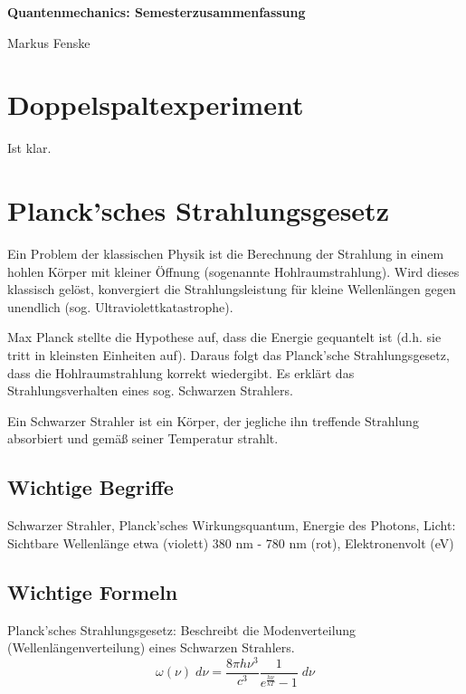 \documentclass[a4paper,german,10pt,smallheadings]{scrartcl}
\begin{document}
\begin{center}
\bfseries %
\sffamily %
\vspace{-40pt}
Quantenmechanics: Semesterzusammenfassung

Markus Fenske
\vspace{-10pt}
\end{center}

\section{Doppelspaltexperiment}

Ist klar.

\section{Planck'sches Strahlungsgesetz}

Ein Problem der klassischen Physik ist die Berechnung der Strahlung in einem
hohlen Körper mit kleiner Öffnung (sogenannte Hohlraumstrahlung). Wird dieses
klassisch gelöst, konvergiert die Strahlungsleistung für kleine Wellenlängen
gegen unendlich (sog. Ultraviolettkatastrophe).

Max Planck stellte die Hypothese auf, dass die Energie gequantelt ist (d.h. sie
tritt in kleinsten Einheiten auf). Daraus folgt das Planck'sche
Strahlungsgesetz, dass die Hohlraumstrahlung korrekt wiedergibt. Es erklärt das
Strahlungsverhalten eines sog. Schwarzen Strahlers.

Ein Schwarzer Strahler ist ein Körper, der jegliche ihn treffende Strahlung
absorbiert und gemäß seiner Temperatur strahlt.

\subsection{Wichtige Begriffe} 

Schwarzer Strahler, Planck'sches Wirkungsquantum, Energie des Photons, Licht:
Sichtbare Wellenlänge etwa (violett) 380 nm - 780 nm (rot), Elektronenvolt (eV)

\subsection{Wichtige Formeln}

Planck'sches Strahlungsgesetz: Beschreibt die Modenverteilung (Wellenlängenverteilung) eines Schwarzen Strahlers.
\begin{equation}
  \omega(\nu) \; d \nu  = \frac{8 \pi h \nu^3}{c^3} \frac{1}{e^\frac{h \nu}{kT} - 1} \; d \nu
\end{equation}
\end{document}
